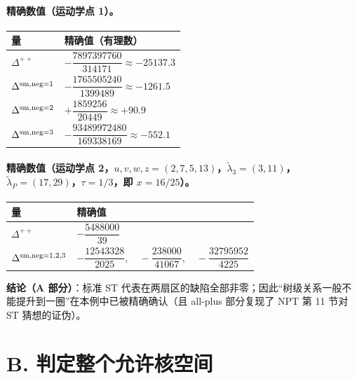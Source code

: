 \documentclass[11pt]{article}
\newcommand{\Pt}{P}
\begin{document}
\paragraph{精确数值（运动学点 1）。}
\begin{center}
\begin{tabular}{ll}
\toprule
量 & 精确值（有理数） \\
\midrule
$\Delta^{++}$ & $-\dfrac{7897397760}{314171}\approx-25137.3$\\
$\Delta^{{\rm sm},\text{neg}=1}$ & $-\dfrac{1765505240}{1399489}\approx-1261.5$\\
$\Delta^{{\rm sm},\text{neg}=2}$ & $+\dfrac{1859256}{20449}\approx+90.9$\\
$\Delta^{{\rm sm},\text{neg}=3}$ & $-\dfrac{93489972480}{169338169}\approx-552.1$\\
\bottomrule
\end{tabular}
\end{center}
\paragraph{精确数值（运动学点 2，$u,v,w,z=(2,7,5,13)$，$\widetilde\lambda_3=(3,11)$，$\widetilde\lambda_\Pt=(17,29)$，$\tau=1/3$，即 $x=16/25$）。}
\begin{center}
\begin{tabular}{ll}
\toprule
量 & 精确值 \\
\midrule
$\Delta^{++}$ & $-\dfrac{5488000}{39}$\\
$\Delta^{{\rm sm},\text{neg}=1,2,3}$ & $-\dfrac{12543328}{2025},\quad -\dfrac{238000}{41067},\quad -\dfrac{32795952}{4225}$\\
\bottomrule
\end{tabular}
\end{center}

\textbf{结论（A 部分）}：标准 ST 代表在两扇区的缺陷全部非零；因此“树级关系一般不能提升到一圈”在本例中已被精确确认（且 all-plus 部分复现了 NPT \cite{NPT2018} 第 11 节对 ST 猜想的证伪）。

\section{B. 判定整个允许核空间}
\label{sec:no-go}
\end{document}
